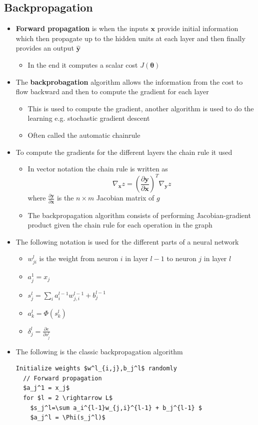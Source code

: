 \documentclass[a4, english]{article}
\begin{document}
\subsection{Backpropagation}
\begin{itemize}
  \item \textbf{Forward propagation} is when the inputs $\pmb x$ provide initial information which then propagate up to the hidden units at each layer and then finally provides an output $\hat{\pmb y}$ 
  \begin{itemize}
  	\item In the end it computes a scalar cost $J(\pmb \theta)$ 
  \end{itemize}   
  \item The \textbf{backprobagation} algorithm allows the information from the cost to flow backward and then to compute the gradient for each layer 
  \begin{itemize}
  	\item This is used to compute the gradient, another algorithm is used to do the learning e.g. stochastic gradient descent 
    \item Often called the automatic chainrule 
  \end{itemize}
  \item To compute the gradients for the different layers the chain rule it used 
  \begin{itemize}
  	\item In vector notation the chain rule is written as 
\begin{equation*}
\nabla_{\pmb x}z = (\frac{\partial \pmb y}{\partial \pmb x})^T \nabla_{\pmb y} z
\end{equation*}
  where $\frac{\partial \pmb y}{\partial \pmb x}$ is the $n \times m$ Jacobian matrix of $g$ 
  \item The backpropagation algorithm consists of performing Jacobian-gradient product given the chain rule for each operation in the graph 
  \end{itemize}
  \item The following notation is used for the different parts of a neural network  
  \begin{itemize}
    \item $w_{ji}^l$ is the weight from neuron $i$ in layer $l-1$ to neuron $j$ in layer $l$
    \item $a_j^1 = x_j$ 
    \item $s_j^l=\sum_ia_i^{l-1}w_{j,i}^{l-1}+b_j^{l-1}$ 
    \item $a_k^l = \Phi(s_k^l)$
    \item $\delta_j^l=\frac{\partial e}{\partial s_j^l}$ 
  \end{itemize} 
  \item The following is the classic backpropagation algorithm 
\begin{lstlisting}[mathescape=true]
  Initialize weights $w^l_{i,j},b_j^l$ randomly
  // Forward propagation 
  $a_j^1 = x_j$
  for $l = 2 \rightarrow L$ 
    $s_j^l=\sum a_i^{l-1}w_{j,i}^{l-1} + b_j^{l-1} $
    $a_j^l = \Phi(s_j^l)$ 
  

\end{lstlisting}
\end{itemize}
\end{document}
